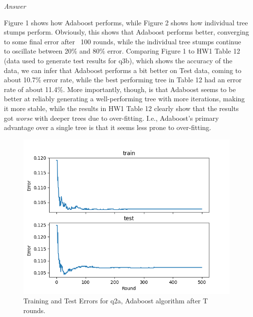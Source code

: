 \documentclass[12pt, fullpage,letterpaper]{article}
\begin{document}
\begin{enumerate}
\begin{enumerate}
	\emph{Answer}
	
	Figure 1 shows how Adaboost performs, while Figure 2 shows how individual tree stumps perform. Obviously, this shows that Adaboost performs better, converging to some final error after ~100 rounds, while the individual tree stumps continue to oscillate between 20\% and 80\% error. Comparing Figure 1 to HW1 Table 12 (data used to generate test results for q3b), which shows the accuracy of the data, we can infer that Adaboost performs a bit better on Test data, coming to about 10.7\% error rate, while the best performing tree in Table 12 had an error rate of about 11.4\%. More importantly, though, is that Adaboost seems to be better at reliably generating a well-performing tree with more iterations, making it more stable, while the results in HW1 Table 12 clearly show that the results got \emph{worse} with deeper trees due to over-fitting. I.e., Adaboost's primary advantage over a single tree is that it seems less prone to over-fitting.
	
	\begin{figure}[htp]
        \centering
        \includegraphics[width=12cm]{q2a_cum_results.png}
        \caption{Training and Test Errors for q2a, Adaboost algorithm after T rounds.}
        \label{fig:q4a}
    \end{figure}
    

\end{enumerate}
\end{enumerate}
\end{document}
